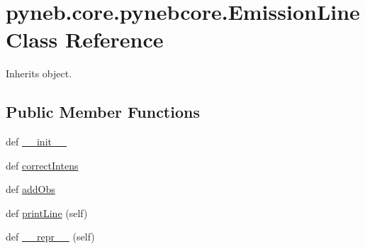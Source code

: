 \hypertarget{classpyneb_1_1core_1_1pynebcore_1_1_emission_line}{}\section{pyneb.\+core.\+pynebcore.\+Emission\+Line Class Reference}
\label{classpyneb_1_1core_1_1pynebcore_1_1_emission_line}


Inherits object.

\subsection*{Public Member Functions}
\begin{DoxyCompactItemize}
\item 
def \hyperlink{classpyneb_1_1core_1_1pynebcore_1_1_emission_line_a4966db926181349d90594f0b6d170c45}{\+\_\+\+\_\+init\+\_\+\+\_\+}
\item 
def \hyperlink{classpyneb_1_1core_1_1pynebcore_1_1_emission_line_a7e915a1443ed01912b44052900b2e581}{correct\+Intens}
\item 
def \hyperlink{classpyneb_1_1core_1_1pynebcore_1_1_emission_line_a1669e4e38ca70d04d3a1395bd6bf237e}{add\+Obs}
\item 
def \hyperlink{classpyneb_1_1core_1_1pynebcore_1_1_emission_line_ad562f9a16ec0a02822e34e98b9329e0e}{print\+Line} (self)
\item 
def \hyperlink{classpyneb_1_1core_1_1pynebcore_1_1_emission_line_ab3e51046d3969f5a72dec03bdba238c2}{\+\_\+\+\_\+repr\+\_\+\+\_\+} (self)
\end{DoxyCompactItemize}
